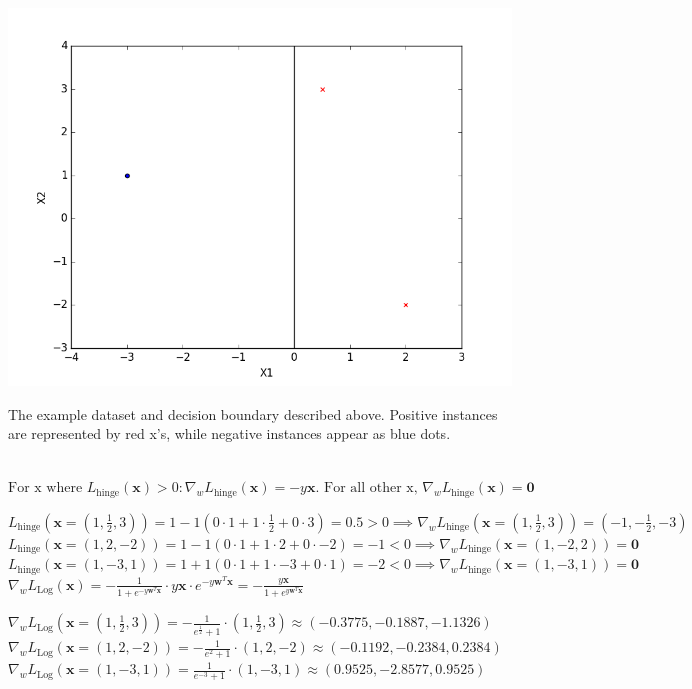 \begin{center}
  \includegraphics[width=.8\textwidth]{images/SimpleDatasetWithDecisionBoundary.png}
\end{center}
\begin{small}
  The example dataset and decision boundary described above. Positive instances are
  represented by red x's, while negative instances appear as blue dots.
\end{small}

\begin{solution}
  \\
  $\text{For x where } L_{\text{hinge}}(\mathbf{x}) > 0: \nabla_{w}L_{\text{hinge}}(\mathbf{x}) = -y\mathbf{x}. \text{ For all other x, } \nabla_{w}L_{\text{hinge}}(\mathbf{x}) = \mathbf{0}$

  $L_{\text{hinge}}(\mathbf{x} = (1, \frac{1}{2}, 3)) = 1 - 1 ( 0 \cdot 1 + 1 \cdot \frac{1}{2} + 0 \cdot 3) = 0.5 > 0 \implies \nabla_{w}L_{\text{hinge}}(\mathbf{x} = (1, \frac{1}{2}, 3)) = (-1, -\frac{1}{2}, -3) $
  $L_{\text{hinge}}(\mathbf{x} = (1, 2, -2)) = 1 - 1 ( 0 \cdot 1 + 1 \cdot 2 + 0 \cdot -2) = -1 < 0 \implies \nabla_{w}L_{\text{hinge}}(\mathbf{x} = (1, -2, 2)) = \mathbf{0}$
  $L_{\text{hinge}}(\mathbf{x} = (1, -3, 1)) = 1 + 1 ( 0 \cdot 1 + 1 \cdot -3 + 0 \cdot 1) = -2 < 0 \implies \nabla_{w}L_{\text{hinge}}(\mathbf{x} = (1, -3, 1)) = \mathbf{0}$ \\

  $\nabla_{w}L_{\text{Log}}(\mathbf{x}) = -\frac{1}{1 + e^{-y\mathbf{w}^T\mathbf{x}}} \cdot y\mathbf{x}\cdot e^{-y\mathbf{w}^T\mathbf{x}} = -\frac{y\mathbf{x}}{1 + e^{y\mathbf{w}^T\mathbf{x}}}$

  $\nabla_{w}L_{\text{Log}}(\mathbf{x} = (1, \frac{1}{2}, 3) ) = -\frac{1}{e^{\frac{1}{2}} + 1} \cdot (1, \frac{1}{2}, 3) \approx (-0.3775, -0.1887, -1.1326)$ \\
  $\nabla_{w}L_{\text{Log}}(\mathbf{x} = (1, 2, -2)) = -\frac{1}{e^{2} + 1} \cdot (1, 2, -2) \approx     (-0.1192, -0.2384, 0.2384)$ \\
  $\nabla_{w}L_{\text{Log}}(\mathbf{x} = (1, -3, 1)) = \frac{1}{e^{-3} + 1} \cdot (1, -3, 1) \approx      (0.9525, -2.8577, 0.9525)$ \\
\end{solution}

